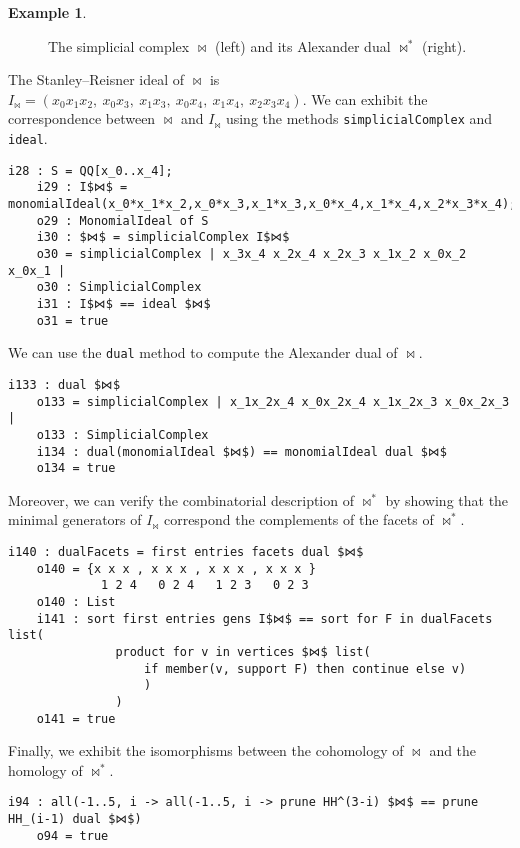 \documentclass[12pt,leqno]{amsart}
\theoremstyle{definition}
\newtheorem{example}[lemma]{Example}
\begin{document}
\begin{example}
\begin{figure}[t]
\begin{subfigure}{0.3\textwidth}
\begin{tikzpicture}[scale = .3]
      \end{tikzpicture}
    \end{subfigure}
    \caption{The simplicial complex $\bowtie$ (left) and its Alexander dual $\bowtie^*$ (right).}\label{the figure-8 and its dual}
  \end{figure}
  The Stanley--Reisner ideal of $\bowtie$ is
  $I_{\bowtie} = (x_0x_1x_2,\ x_0x_3,\ x_1x_3,\ x_0x_4,\ x_1x_4,\
  x_2x_3x_4)$. We can exhibit the correspondence between $\bowtie$ and
  $I_{\bowtie}$ using the methods \texttt{simplicialComplex} and
  \texttt{ideal}.
\begin{lstlisting}[basicstyle={\ttfamily \scriptsize}, xleftmargin=-23pt]
    i28 : S = QQ[x_0..x_4];
    i29 : I$⋈$ = monomialIdeal(x_0*x_1*x_2,x_0*x_3,x_1*x_3,x_0*x_4,x_1*x_4,x_2*x_3*x_4);
    o29 : MonomialIdeal of S
    i30 : $⋈$ = simplicialComplex I$⋈$
    o30 = simplicialComplex | x_3x_4 x_2x_4 x_2x_3 x_1x_2 x_0x_2 x_0x_1 |
    o30 : SimplicialComplex
    i31 : I$⋈$ == ideal $⋈$
    o31 = true
\end{lstlisting}
  We can use the \texttt{dual} method to compute the Alexander dual of
  $\bowtie$.
\begin{lstlisting}[basicstyle={\ttfamily \scriptsize}, xleftmargin=-23pt]
    i133 : dual $⋈$
    o133 = simplicialComplex | x_1x_2x_4 x_0x_2x_4 x_1x_2x_3 x_0x_2x_3 |
    o133 : SimplicialComplex
    i134 : dual(monomialIdeal $⋈$) == monomialIdeal dual $⋈$
    o134 = true
\end{lstlisting}
  Moreover, we can verify the combinatorial description of $\bowtie^*$ by
  showing that the minimal generators of $I_{\bowtie}$ correspond the
  complements of the facets of $\bowtie^*$.
\begin{lstlisting}[basicstyle={\ttfamily \scriptsize}, xleftmargin=-23pt]
    i140 : dualFacets = first entries facets dual $⋈$
    o140 = {x x x , x x x , x x x , x x x }
             1 2 4   0 2 4   1 2 3   0 2 3
    o140 : List
    i141 : sort first entries gens I$⋈$ == sort for F in dualFacets list(
               product for v in vertices $⋈$ list(
                   if member(v, support F) then continue else v)
                   )
               )
    o141 = true
\end{lstlisting}
  Finally, we exhibit the isomorphisms between the cohomology of $\bowtie$ and
  the homology of $\bowtie^*$.
\begin{lstlisting}[basicstyle={\ttfamily \scriptsize}, xleftmargin=-23pt]
    i94 : all(-1..5, i -> all(-1..5, i -> prune HH^(3-i) $⋈$ == prune HH_(i-1) dual $⋈$)
    o94 = true
\end{lstlisting}  
\end{example}
\end{document}
